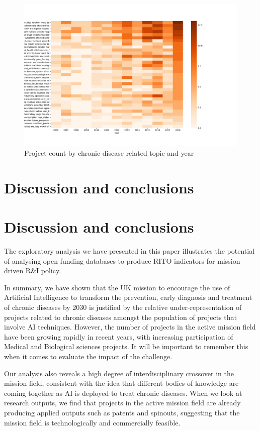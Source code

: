 \documentclass[11pt]{article}
\begin{document}
\begin{figure}[!ht]
    \centering
    \includegraphics[width=\textwidth]{figures/fig_21_heatmap.pdf}
    \caption{Project count by chronic disease related topic and year}
    \label{fig:topic_evol}
\end{figure}

\section{Discussion and conclusions}
\label{sec:conclusion}

\section{Discussion and conclusions}
The exploratory analysis we have presented in this paper illustrates the potential of analysing open funding databases to produce RITO indicators for mission-driven R&I policy.

In summary, we have shown that the UK mission to encourage the use of Artificial Intelligence to transform the prevention, early diagnosis and treatment of chronic diseases by 2030 is justified by the relative under-representation of projects related to chronic diseases amongst the population of projects that involve AI techniques. However, the number of
projects in the active mission field have been growing rapidly in recent years, with increasing participation of Medical and Biological sciences projects. It will be important to remember this when it comes to evaluate the impact of the challenge.

Our analysis also reveals a high degree of interdisciplinary crossover in the mission field, consistent with the idea that different bodies of knowledge are coming together as AI is deployed to treat chronic diseases. When we look at research outputs, we find that projects in the active mission field are already producing applied outputs such as patents and spinouts, suggesting that the mission field is technologically and commercially feasible.
\end{document}

